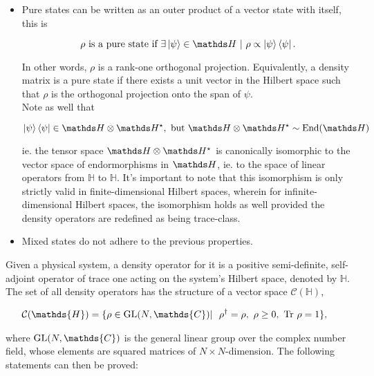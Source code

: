 \documentclass{homework}
\begin{document}
\begin{itemize}
    \item Pure states can be written as an outer product of a vector state with itself, this is 
    
    $$
    \rho \textnormal{ is a pure state if } \exists \ket{\psi} \in \hilbert \blanky | \blanky \rho \propto \ket{\psi} \bra{\psi}. 
    $$
    
    In other words, $\rho$ is a rank-one orthogonal projection. Equivalently, a density matrix is a pure state if there exists a unit vector in the Hilbert space such that $\rho$ is the orthogonal projection onto the span of $\psi$. \\
    
    Note as well that 
    
    $$
       \ket{\psi} \bra{\psi} \in \hilbert \otimes \hilbert^{\star}, \textnormal{ but } \hilbert \otimes \hilbert^{\star} \sim \textnormal{End}(\hilbert)
    $$
    
    ie. the tensor space $\hilbert \otimes \hilbert^{\star}$ is canonically isomorphic to the vector space of endormorphisms in $\hilbert$, ie. to the space of linear operators from $\mathds{H}$ to $\mathds{H}$.
    It's important to note that this isomorphism is only strictly valid in finite-dimensional Hilbert spaces, wherein for infinite-dimensional Hilbert spaces, the isomorphism holds as well provided the density operators are redefined as being trace-class.
    \item Mixed states do not adhere to the previous properties. 
\end{itemize}

Given a physical system, a density operator for it is a positive semi-definite, self-adjoint operator of trace one acting on the system's Hilbert space, denoted by $\mathds{H}$. The set of all density operators has the structure of a vector space $\mathcal{C}(\mathds{H})$,

\begin{equation}
\begin{split}
\mathcal{C}(\mathds{H}) = \{ \rho& \in \textnormal{GL}(N, \mathds{C}) | \blanky
\blanky \rho^\dagger = \rho, 
\blanky \rho \geq 0, \blanky \textnormal{Tr } \rho = 1 \},    
\end{split}
\end{equation}

where $\textnormal{GL}(N, \mathds{C})$ is the general linear group over the complex number field, whose elements are squared matrices of $N \times N$-dimension. The following statements can then be proved:
\end{document}
